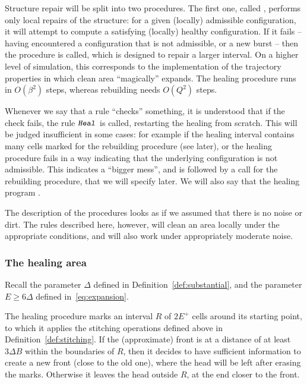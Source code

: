 \documentclass[12pt]{memoir}
\newcommand{\authnote}[3]
{\text{{ \textcolor{#3}{\( \langle\hspace{-0.2em}\langle \)\textsf{\footnotesize #1: #2}\( \rangle\hspace{-0.2em}\rangle \)}}}}
\newcommand{\authnote}[2]{}
\newcommand{\Pnote}[1]{{\authnote{P}{#1}{cyan}}}
\renewcommand{\ge}{\geq}
\newcommand{\rul}[1]{\ensuremath{\texttt{\slshape #1\/}}}
\def\B{B}
\newcommand{\E}{E}
\newcommand{\R}{R}
\newcommand{\rHeal}{\rul{Heal}}
\begin{document}
Structure repair will be split into two procedures.
The first one, called , performs
only local repairs of the structure: for a given (locally) admissible configuration,
it will attempt to compute a satisfying (locally) healthy configuration.
If it fails -- having encountered a configuration that is not admissible, or
a new burst -- then the  procedure is called, which is designed
to repair a larger interval.
On a higher level of simulation, 
this corresponds to the implementation of the trajectory properties
in which clean area ``magically'' expands.
The healing procedure runs in \( O(\beta^{2}) \) 
steps, whereas rebuilding needs \( O(Q^{2}) \) steps. \Pnote{maybe even \( Q^{3} \)?}

Whenever we say that a rule ``checks'' something,
it is understood that if the check fails, the rule \( \rHeal \) is called, restarting the 
healing from scratch.
This will be judged insufficient in some cases: for example if 
the healing interval contains many cells marked for the rebuilding procedure (see later),
or the healing procedure fails in a way
indicating that the underlying configuration is not admissible.
This indicates a ``bigger mess'', and is followed by a call for
the rebuilding procedure, that we will specify later.
We will also say that the healing program .

The description of the procedures looks as if we assumed that there is no noise or dirt.
The rules described here, however, will clean an area locally under the 
appropriate conditions, and will also work under appropriately moderate noise.

\subsubsection{The healing area}

Recall the parameter \( \Delta \) defined in Definition~\ref{def:substantial},
and the parameter \( \E\ge 6\Delta \) defined in~\eqref{eq:expansion}. %

The healing procedure 
marks an interval \( \R \) of \( 2\E^{+} \) cells around its starting point, to which it applies the
stitching operations defined above in Definition~\ref{def:stitching}.
If the (approximate) front is at a distance of at least \( 3\Delta\B \) within the boundaries
of \( \R \), then it decides to have sufficient information to create a 
new front (close to the old one), where the head will be left after erasing the marks.
Otherwise it leaves the head outside \( \R \), at the end closer to the front.
\end{document}
